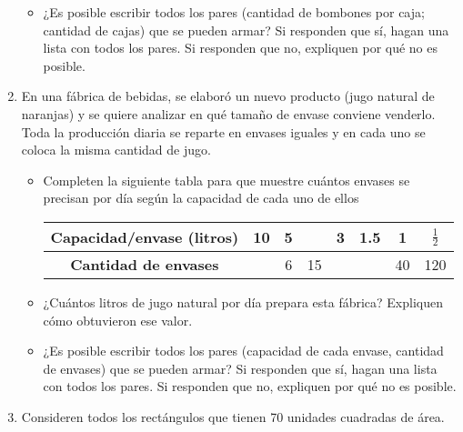 \documentclass[12pt,a4paper]{article}
\begin{document}
\begin{enumerate}
\begin{itemize}
\vspace{3.5mm}

\item ¿Es posible escribir todos los pares (cantidad de bombones por caja; cantidad de cajas) que se pueden armar? Si responden que sí, hagan una lista con todos los pares. Si responden que no, expliquen por qué no es posible.
\end{itemize}

\item En una fábrica de bebidas, se elaboró un nuevo producto (jugo natural de naranjas) y se quiere analizar en qué tamaño de envase conviene venderlo. Toda la producción diaria se reparte en envases iguales y en cada uno se coloca la misma cantidad de jugo.

\begin{itemize}
\item Completen la siguiente tabla para que muestre cuántos envases se precisan por día según la capacidad de cada uno de ellos

\vspace{3.5mm}

\begin{center}
\small
\begin{tabular}{|c|c|c|c|c|c|c|c|}
\hline
\textbf{Capacidad/envase (litros)} & 10 & 5 & & 3 & 1.5 & 1 & $\frac{1}{2}$ \\
\hline
\textbf{Cantidad de envases} & & 6 & 15 & & & 40 & 120 \\
\hline
\end{tabular}
\end{center}

\vspace{3.5mm}

\item ¿Cuántos litros de jugo natural por día prepara esta fábrica? Expliquen cómo obtuvieron ese valor.
\item ¿Es posible escribir todos los pares (capacidad de cada envase, cantidad de envases) que se pueden armar? Si responden que sí, hagan una lista con todos los pares. Si responden que no, expliquen por qué no es posible.
\end{itemize}

\item Consideren todos los rectángulos que tienen 70 unidades cuadradas de área.


\end{enumerate}
\end{document}

